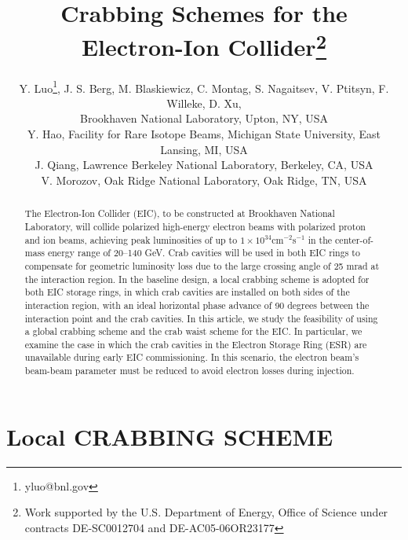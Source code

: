 \documentclass[letter,
keeplastbox,   %
]{jacow}
\begin{document}
\title{Crabbing Schemes for the Electron-Ion Collider\thanks{Work supported by the U.S. Department of Energy, Office of Science under contracts DE-SC0012704 and DE-AC05-06OR23177}}
\author{Y. Luo\thanks{yluo@bnl.gov}, J. S. Berg, M. Blaskiewicz, C. Montag, S. Nagaitsev, V. Ptitsyn, F. Willeke, D. Xu, \\ Brookhaven National Laboratory, Upton, NY, USA\\
Y. Hao, Facility for Rare Isotope Beams, Michigan State University, East Lansing, MI, USA \\
J. Qiang, Lawrence Berkeley National Laboratory, Berkeley, CA, USA \\
V. Morozov, Oak Ridge National Laboratory, Oak Ridge, TN, USA }
\maketitle

\begin{abstract}

The Electron-Ion Collider (EIC), to be constructed at Brookhaven National Laboratory, will collide polarized high-energy electron beams with polarized proton and ion beams, achieving peak luminosities of up to $1 \times 10^{34}$cm$^{-2}$s$^{-1}$ in the center-of-mass energy range of 20–140 GeV. Crab cavities will be used in both EIC rings to compensate for geometric luminosity loss due to the large crossing angle of 25 mrad at the interaction region. In the baseline design, a local crabbing scheme is adopted for both EIC storage rings, in which crab cavities are installed on both sides of the interaction region, with an ideal horizontal phase advance of 90 degrees between the interaction point and the crab cavities. In this article, we study the feasibility of using a global crabbing scheme and the crab waist scheme for the EIC. In particular, we examine the case in which the crab cavities in the Electron Storage Ring (ESR) are unavailable during early EIC commissioning. In this scenario, the electron beam's beam-beam parameter must be reduced to avoid electron losses during injection.

\end{abstract}


\section{Local CRABBING SCHEME}
\end{document}
